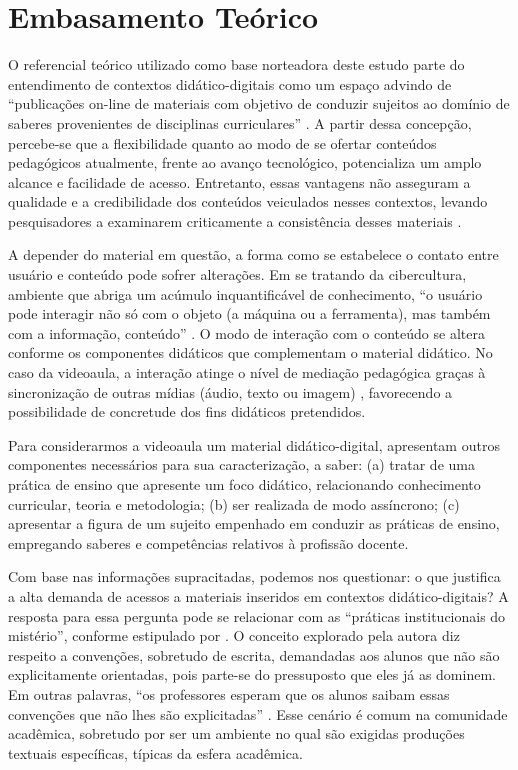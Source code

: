 \section{Embasamento Teórico}\label{sec-embasamento}

O referencial teórico utilizado como base norteadora deste estudo parte
do entendimento de contextos didático-digitais como um espaço advindo de
``publicações on-line de materiais com objetivo de conduzir sujeitos ao
domínio de saberes provenientes de disciplinas curriculares''
\cite[p.~46]{laurentino2023}. A partir dessa concepção, percebe-se
que a flexibilidade quanto ao modo de se ofertar conteúdos pedagógicos
atualmente, frente ao avanço tecnológico, potencializa um amplo alcance
e facilidade de acesso. Entretanto, essas vantagens não asseguram a
qualidade e a credibilidade dos conteúdos veiculados nesses contextos,
levando pesquisadores a examinarem criticamente a consistência desses
materiais \cite{bessa2020,laurentino_videoaulas_2019}.

A depender do material em questão, a forma como se estabelece o contato
entre usuário e conteúdo pode sofrer alterações. Em se tratando da
cibercultura, ambiente que abriga um acúmulo inquantificável de
conhecimento, ``o usuário pode interagir não só com o objeto (a máquina
ou a ferramenta), mas também com a informação, conteúdo'' \cite[p.~8]{rocha2005}. O modo de interação com o conteúdo se altera
conforme os componentes didáticos que complementam o material didático.
No caso da videoaula, a interação atinge o nível de mediação pedagógica
graças à sincronização de outras mídias (áudio, texto ou imagem)
\cite{barrere2014}, favorecendo a possibilidade de concretude dos fins
didáticos pretendidos.

Para considerarmos a videoaula um material didático-digital, \textcite{laurentino2023} apresentam outros componentes necessários para sua
caracterização, a saber: (a) tratar de uma prática de ensino que
apresente um foco didático, relacionando conhecimento curricular, teoria
e metodologia; (b) ser realizada de modo assíncrono; (c) apresentar a
figura de um sujeito empenhado em conduzir as práticas de ensino,
empregando saberes e competências relativos à profissão docente.

Com base nas informações supracitadas, podemos nos questionar: o que
justifica a alta demanda de acessos a materiais inseridos em contextos
didático-digitais? A resposta para essa pergunta pode se relacionar com
as ``práticas institucionais do mistério'', conforme estipulado por
\textcite{lillis1999}. O conceito explorado pela autora diz respeito a
convenções, sobretudo de escrita, demandadas aos alunos que não são
explicitamente orientadas, pois parte-se do pressuposto que eles já as
dominem. Em outras palavras, ``os professores esperam que os alunos
saibam essas convenções que não lhes são explicitadas'' \cite[p.~363]{fiad2011}. Esse cenário é comum na comunidade acadêmica, sobretudo por ser um
ambiente no qual são exigidas produções textuais específicas, típicas da
esfera acadêmica.

